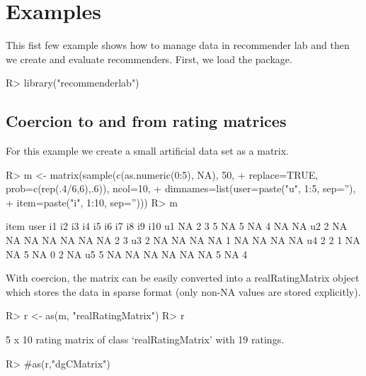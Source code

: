 \documentclass[nojss]{jss}
\begin{document}
\section{Examples}
\label{sec:examples}
This fist few example shows how to manage data in recommender lab and then
we create and evaluate recommenders.
First, we load the package.

\begin{Schunk}
\begin{Sinput}
R> library("recommenderlab")
\end{Sinput}
\end{Schunk}

\subsection{Coercion to and from rating matrices}

For this example we create a small
artificial data set as a matrix.

\begin{Schunk}
\begin{Sinput}
R> m <- matrix(sample(c(as.numeric(0:5), NA), 50,
+     replace=TRUE, prob=c(rep(.4/6,6),.6)), ncol=10,
+     dimnames=list(user=paste("u", 1:5, sep=''),
+ 	item=paste("i", 1:10, sep='')))
R> m
\end{Sinput}
\begin{Soutput}
    item
user i1 i2 i3 i4 i5 i6 i7 i8 i9 i10
  u1 NA  2  3  5 NA  5 NA  4 NA  NA
  u2  2 NA NA NA NA NA NA NA  2   3
  u3  2 NA NA NA NA  1 NA NA NA  NA
  u4  2  2  1 NA NA  5 NA  0  2  NA
  u5  5 NA NA NA NA NA NA  5 NA   4
\end{Soutput}
\end{Schunk}

With coercion, the matrix can be easily converted into
a realRatingMatrix object which stores the data in sparse
format (only non-NA values are stored explicitly).

\begin{Schunk}
\begin{Sinput}
R> r <- as(m, "realRatingMatrix")
R> r
\end{Sinput}
\begin{Soutput}
5 x 10 rating matrix of class ‘realRatingMatrix’ with 19 ratings.
\end{Soutput}
\begin{Sinput}
R> #as(r,"dgCMatrix")
\end{Sinput}
\end{Schunk}
\end{document}
